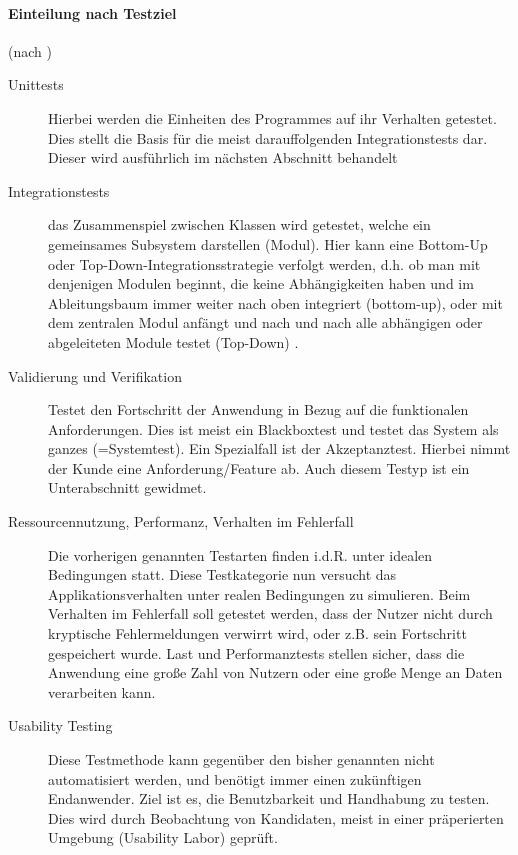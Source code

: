 \paragraph{Einteilung nach Testziel} (nach \citep[S. 238ff]{hunt_pragmatic_1999})
\begin{description}
 \item[Unittests] Hierbei werden die Einheiten des Programmes auf ihr Verhalten getestet. Dies stellt die Basis für die meist darauffolgenden Integrationstests dar. Dieser wird ausführlich im nächsten Abschnitt behandelt
 \item[Integrationstests]  das Zusammenspiel zwischen Klassen wird getestet, welche ein gemeinsames Subsystem darstellen (Modul). Hier kann eine Bottom-Up oder Top-Down-Integrationsstrategie verfolgt werden, d.h. ob man mit denjenigen Modulen beginnt, die keine Abhängigkeiten haben und im Ableitungsbaum immer weiter nach oben integriert (bottom-up), oder mit dem zentralen Modul anfängt und nach und nach alle abhängigen oder abgeleiteten Module testet (Top-Down) \citep{liggesmeyer_modultest_1990}.
 \item[Validierung und Verifikation] Testet den Fortschritt der Anwendung in Bezug auf die funktionalen Anforderungen. Dies ist meist ein Blackboxtest und testet das System als ganzes (=Systemtest). Ein Spezialfall ist der Akzeptanztest. Hierbei nimmt der Kunde eine Anforderung/Feature ab. Auch diesem Testyp ist ein Unterabschnitt gewidmet.
 \item[Ressourcennutzung, Performanz, Verhalten im Fehlerfall] Die vorherigen genannten Testarten finden i.d.R. unter idealen Bedingungen statt. Diese Testkategorie nun versucht das Applikationsverhalten unter realen Bedingungen zu simulieren. Beim Verhalten im Fehlerfall soll getestet werden, dass der Nutzer nicht durch kryptische Fehlermeldungen verwirrt wird, oder z.B. sein Fortschritt gespeichert wurde. Last und Performanztests stellen sicher, dass die Anwendung eine große Zahl von Nutzern oder eine große Menge an Daten verarbeiten kann.
 \item[Usability Testing] Diese Testmethode kann gegenüber den bisher genannten nicht automatisiert werden, und benötigt immer einen zukünftigen Endanwender. Ziel ist es, die Benutzbarkeit und Handhabung zu testen. Dies wird durch Beobachtung von Kandidaten, meist in einer präperierten Umgebung (Usability Labor) geprüft.
\end{description}

